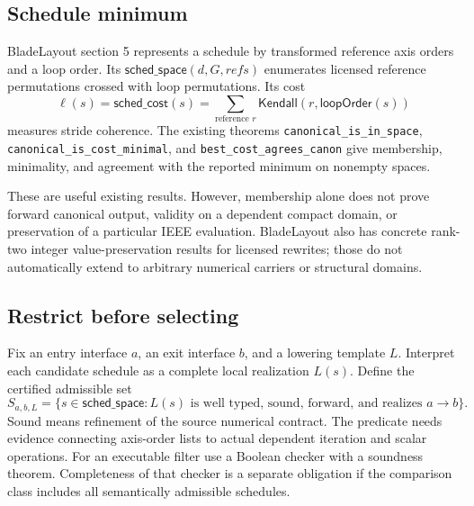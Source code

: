 \documentclass[11pt]{article}
\begin{document}
\subsection{Schedule minimum}
BladeLayout section 5 represents a schedule by transformed reference axis orders and a loop order. Its $\mathsf{sched\_space}(d,G,\mathit{refs})$ enumerates licensed reference permutations crossed with loop permutations. Its cost
\[
 \ell(s)=\mathsf{sched\_cost}(s)
        =\sum_{\text{reference }r}\mathsf{Kendall}(r,\mathsf{loopOrder}(s))
\]
measures stride coherence. The existing theorems
\texttt{canonical\_is\_in\_space},
\texttt{canonical\_is\_cost\_minimal}, and
\texttt{best\_cost\_agrees\_canon}
give membership, minimality, and agreement with the reported minimum on nonempty spaces.

These are useful existing results. However, membership alone does not prove forward canonical output, validity on a dependent compact domain, or preservation of a particular IEEE evaluation. BladeLayout also has concrete rank-two integer value-preservation results for licensed rewrites; those do not automatically extend to arbitrary numerical carriers or structural domains.

\subsection{Restrict before selecting}
Fix an entry interface $a$, an exit interface $b$, and a lowering template $L$. Interpret each candidate schedule as a complete local realization $L(s)$. Define the certified admissible set
\[
 S_{a,b,L}=\{s\in\mathsf{sched\_space}:
       L(s)\text{ is well typed, sound, forward, and realizes }a\to b\}.
\]
Sound means refinement of the source numerical contract. The predicate needs evidence connecting axis-order lists to actual dependent iteration and scalar operations. For an executable filter use a Boolean checker with a soundness theorem. Completeness of that checker is a separate obligation if the comparison class includes all semantically admissible schedules.
\end{document}
